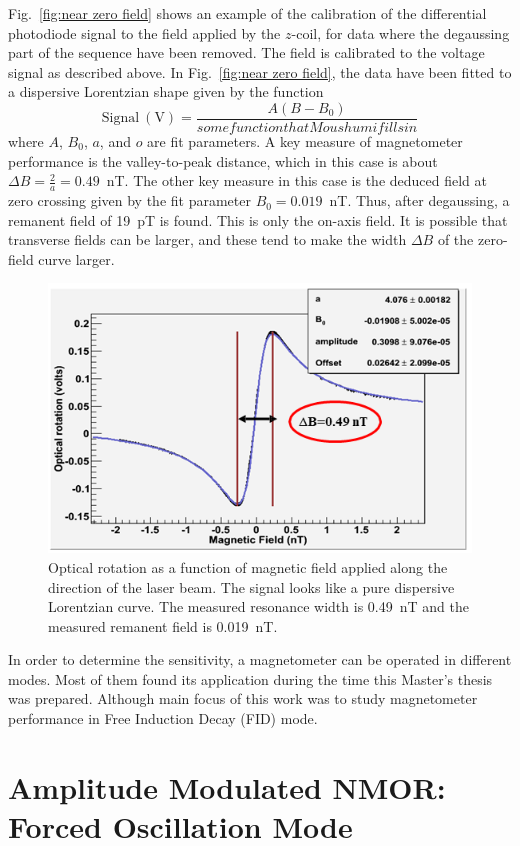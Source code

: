 Fig.~\ref{fig:near zero field} shows an example of the calibration of
the differential photodiode signal to the field applied by the
$z$-coil, for data where the degaussing part of the sequence have been
removed.  The field is calibrated to the voltage signal as described
above.  In Fig.~\ref{fig:near zero field}, the data have been fitted
to a dispersive Lorentzian shape given by the function
\begin{equation}
\mathrm{Signal~(V)}=\frac{A(B-B_0)}{somefunctionthatMoushumifillsin}
\end{equation}
where $A$, $B_0$, $a$, and $o$ are fit parameters.  A key measure of
magnetometer performance is the valley-to-peak distance, which in this
case is about $\Delta B=\frac{2}{a}=0.49$~nT.  The other key measure
in this case is the deduced field at zero crossing given by the fit
parameter $B_0=0.019$~nT.  Thus, after degaussing, a remanent field of
19~pT is found.  This is only the on-axis field.  It is possible that
transverse fields can be larger, and these tend to make the width
$\Delta B$ of the zero-field curve larger.

\begin{figure}[h]
\centering\includegraphics[width=0.7\linewidth]{figures/near_zero_field}
\caption{Optical rotation as a function of magnetic field applied
  along the direction of the laser beam. The signal looks like a pure
  dispersive Lorentzian curve. The measured resonance width is 0.49~nT
  and the measured remanent field is 0.019~nT.\label{fig:near zero
    field}}
\end{figure}

In order to determine the sensitivity, a magnetometer can be operated
in different modes. Most of them found its application during the time
this Master's thesis was prepared. Although main focus of this work
was to study magnetometer performance in Free Induction Decay (FID)
mode.

\section{Amplitude Modulated NMOR:  Forced Oscillation Mode}

